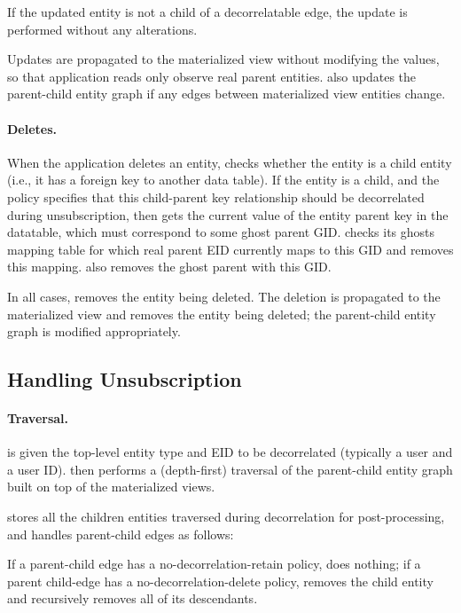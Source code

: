 If the updated entity is not a child of a decorrelatable edge, the update is performed without any
alterations.

Updates are propagated to the materialized view without modifying the values, so that application
reads only observe real parent entities.
\name also updates the parent-child entity graph if any edges between materialized view entities change.

\paragraph{Deletes.}
When the application deletes an entity, \name checks whether
the entity is a child entity (i.e., it has a foreign key to another data table).
If the entity is a child, and the policy specifies that this child-parent key
relationship should be decorrelated during unsubscription, then \name gets the current value of the
entity parent key in the datatable, which must correspond to some ghost parent GID.
\name checks its ghosts mapping table for which real parent EID currently maps to this GID and removes
this mapping. \name also removes the ghost parent with this GID.

In all cases, \name removes the entity being deleted.
The deletion is propagated to the materialized view and removes the entity being deleted; the
parent-child entity graph is modified appropriately.

\subsection{Handling Unsubscription}
\paragraph{Traversal.}
\name is given the top-level entity type and EID to be decorrelated (typically a user and a user ID).
\name then performs a (depth-first) traversal of the parent-child entity graph built on top of the materialized
views.

\name stores all the children entities traversed during decorrelation for post-processing, and
handles parent-child edges as follows:

If a parent-child edge has a no-decorrelation-retain policy, \name does nothing; if a parent child-edge has a
no-decorrelation-delete policy, \name removes the child entity and recursively removes all of its
descendants.

